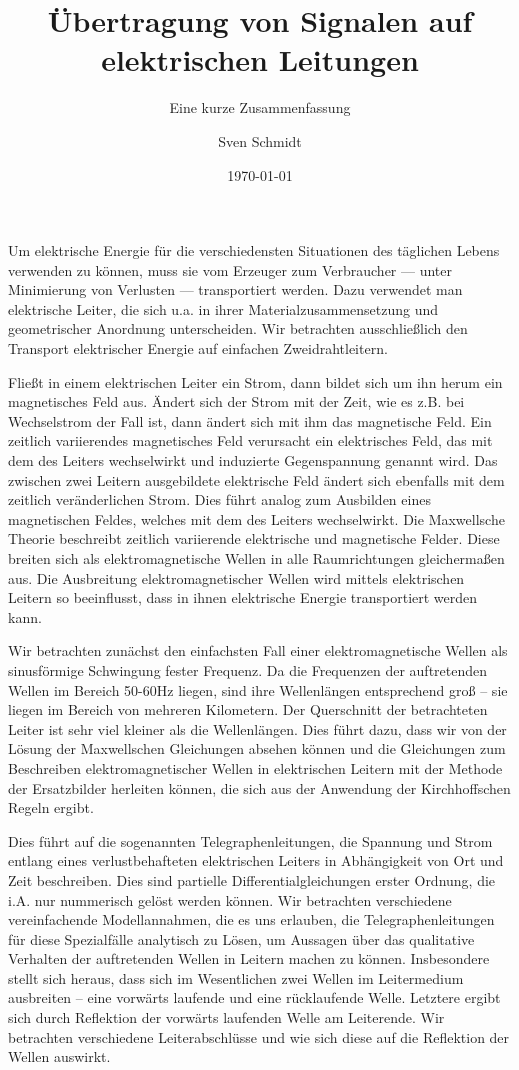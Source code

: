 \documentclass[12pt,ngerman,parkskip=half-]{scrreprt}
\title{Übertragung von Signalen auf elektrischen Leitungen}
\subtitle{Eine kurze Zusammenfassung}
\author{Sven Schmidt}
\date{\today}
\begin{document}
\maketitle

Um elektrische Energie für die verschiedensten Situationen des täglichen Lebens verwenden zu können, muss sie vom Erzeuger zum Verbraucher --- unter Minimierung von Verlusten --- transportiert werden. Dazu verwendet man elektrische Leiter, die sich u.a. in ihrer Materialzusammensetzung und geometrischer Anordnung unterscheiden.
Wir betrachten ausschließlich den Transport elektrischer Energie auf einfachen Zweidrahtleitern.

Fließt in einem elektrischen Leiter ein Strom, dann bildet sich um ihn herum ein magnetisches Feld aus. Ändert sich der Strom mit der Zeit, wie es z.B. bei Wechselstrom der Fall ist, dann ändert sich mit ihm das magnetische Feld. Ein zeitlich variierendes magnetisches Feld verursacht ein elektrisches Feld, das mit dem des Leiters wechselwirkt und induzierte Gegenspannung genannt wird. Das zwischen zwei Leitern ausgebildete elektrische Feld ändert sich ebenfalls mit dem zeitlich veränderlichen Strom. Dies führt analog zum Ausbilden eines magnetischen Feldes, welches mit dem des Leiters wechselwirkt. Die Maxwellsche Theorie beschreibt zeitlich variierende elektrische und magnetische Felder. Diese breiten sich als elektromagnetische Wellen in alle Raumrichtungen gleichermaßen aus.  Die Ausbreitung elektromagnetischer Wellen wird mittels elektrischen Leitern so beeinflusst, dass in ihnen elektrische Energie transportiert werden kann.

Wir betrachten zunächst den einfachsten Fall einer elektromagnetische Wellen als sinusförmige Schwingung fester Frequenz. Da die Frequenzen der auftretenden Wellen im Bereich 50-60Hz liegen, sind ihre Wellenlängen entsprechend groß -- sie liegen im Bereich von mehreren Kilometern. Der Querschnitt der betrachteten Leiter ist sehr viel kleiner als die Wellenlängen. Dies führt dazu, dass wir von der Lösung der Maxwellschen Gleichungen absehen können und die Gleichungen zum Beschreiben elektromagnetischer Wellen in elektrischen Leitern mit der Methode der Ersatzbilder herleiten können, die sich aus der Anwendung der Kirchhoffschen Regeln ergibt.

Dies führt auf die sogenannten Telegraphenleitungen, die Spannung und Strom entlang eines verlustbehafteten elektrischen Leiters in Abhängigkeit von Ort und Zeit beschreiben. Dies sind partielle Differentialgleichungen erster Ordnung, die i.A. nur nummerisch gelöst werden können. Wir betrachten verschiedene vereinfachende Modellannahmen, die es uns erlauben, die Telegraphenleitungen für diese Spezialfälle analytisch zu Lösen, um Aussagen über das qualitative Verhalten der auftretenden Wellen in Leitern machen zu können. Insbesondere stellt sich heraus, dass sich im Wesentlichen zwei Wellen im Leitermedium ausbreiten -- eine vorwärts laufende und eine rücklaufende Welle. Letztere ergibt sich durch Reflektion der vorwärts laufenden Welle am Leiterende. Wir betrachten verschiedene Leiterabschlüsse und wie sich diese auf die Reflektion der Wellen auswirkt.
\end{document}
